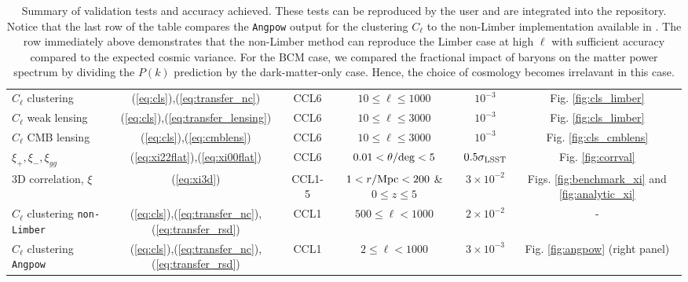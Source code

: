 \begin{sidewaystable*}[!htp]
\begin{tabular}{ l|c c c c c}
    $C_\ell$ clustering & (\ref{eq:cls}),(\ref{eq:transfer_nc})& CCL6 &$10 \leq \ell\leq 1000$ &  $10^{-3}$ & Fig. \ref{fig:cls_limber}\\
    $C_\ell$ weak lensing & (\ref{eq:cls}),(\ref{eq:transfer_lensing})& CCL6 &$10 \leq \ell\leq 3000$ &  $10^{-3}$ & Fig. \ref{fig:cls_limber}\\
    $C_\ell$ CMB lensing &(\ref{eq:cls}),(\ref{eq:cmblens}) & CCL6 & $10 \leq \ell\leq 3000$& $10^{-3}$ & Fig. \ref{fig:cls_cmblens}\\
    $\xi_+,\xi_-,\xi_{gg}$ & (\ref{eq:xi22flat}),(\ref{eq:xi00flat}) & CCL6 & $0.01< \theta/{\rm deg}< 5$&  $0.5\sigma_{\rm LSST}$ & Fig. \ref{fig:corrval}\\
    3D correlation, $\xi$ & (\ref{eq:xi3d}) & CCL1-5 & $1<r/{\rm Mpc}<200$ \& $0 \leq z \leq 5$& $3\times 10^{-2}$ & Figs. \ref{fig:benchmark_xi} and \ref{fig:analytic_xi} \\
    $C_\ell$ clustering {\tt non-Limber} &  (\ref{eq:cls}),(\ref{eq:transfer_nc}),(\ref{eq:transfer_rsd}) & CCL1 & $500 \leq \ell < 1000$ & $2\times 10^{-2}$ & - \\
    $C_\ell$ clustering {\tt Angpow} & (\ref{eq:cls}),(\ref{eq:transfer_nc}),(\ref{eq:transfer_rsd}) & CCL1 & $2 \leq \ell < 1000$ & $3\times 10^{-3}$  & Fig. \ref{fig:angpow} (right panel)\\
    \hline
  \end{tabular}
  \caption{Summary of \ccl validation tests and accuracy achieved. These tests can be reproduced by the user and are integrated into the \ccl repository. Notice that the last row of the table compares the {\tt Angpow} output for the clustering $C_\ell$ to the non-Limber implementation available in \ccl. The row immediately above demonstrates that the non-Limber method can reproduce the Limber case at high $\ell$ with sufficient accuracy compared to the expected cosmic variance. For the BCM case, we compared the fractional impact of baryons on the matter power spectrum by dividing the $P(k)$ prediction by the dark-matter-only case. Hence, the choice of cosmology becomes irrelavant in this case.}
  \label{tab:tests}
\end{sidewaystable*}
